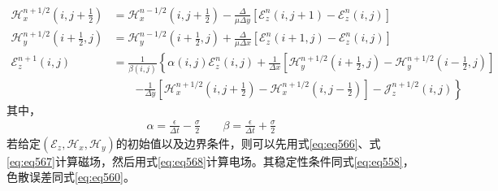 \documentclass{article}
\numberwithin{equation}{section}
\begin{document}
\begin{align}
    \label{eq:eq566}
    \mathcal{H}_x^{n+1/2}\left(i,j+\frac{1}{2}\right)&=\mathcal{H}_x^{n-1/2}\left(i,j+\frac{1}{2}\right)-\frac{\Delta}{\mu\Delta y}\left[\mathcal{E}_z^{n}\left(i,j+1\right)-\mathcal{E}_z^{n}\left(i,j\right)\right] \\
    \label{eq:eq567}
    \mathcal{H}_y^{n+1/2}\left(i+\frac{1}{2},j\right)&=\mathcal{H}_y^{n-1/2}\left(i+\frac{1}{2},j\right)+\frac{\Delta}{\mu\Delta x}\left[\mathcal{E}_z^{n}\left(i+1,j\right)-\mathcal{E}_z^{n}\left(i,j\right)\right] \\
    \label{eq:eq568}
    \mathcal{E}_z^{n+1}\left(i,j\right)&=\frac{1}{\beta(i,j)}\left\{\alpha(i,j)\mathcal{E}_z^{n}\left(i,j\right)+\frac{1}{\Delta x}\left[\mathcal{H}_y^{n+1/2}\left(i+\frac{1}{2},j\right)-\mathcal{H}_y^{n+1/2}\left(i-\frac{1}{2},j\right)\right]\right. \nonumber \\
                                       &\qquad\left.-\frac{1}{\Delta y}\left[\mathcal{H}_x^{n+1/2}\left(i,j+\frac{1}{2}\right)-\mathcal{H}_x^{n+1/2}\left(i,j-\frac{1}{2}\right)\right]-\mathcal{J}_z^{n+1/2}(i,j)\right\}
\end{align}
其中，
\begin{align}
    \label{eq:eq569}
    \alpha=\frac{\epsilon}{\Delta t}-\frac{\sigma}{2}\qquad\beta=\frac{\epsilon}{\Delta t}+\frac{\sigma}{2}
\end{align}
若给定$(\mathcal{E}_z,\mathcal{H}_x,\mathcal{H}_y)$的初始值以及边界条件，则可以先用式\ref{eq:eq566}、式\ref{eq:eq567}计算磁场，然后用式\ref{eq:eq568}计算电场。其稳定性条件同式\ref{eq:eq558}，色散误差同式\ref{eq:eq560}。
\end{document}
